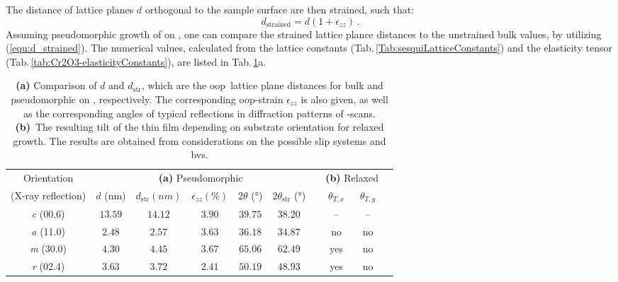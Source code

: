 The distance of lattice planes $d$ orthogonal to the sample surface are then strained, such that:
\begin{equation}
    \label{equ:d_strained}
    d_\mathrm{strained}=d(1+\epsilon_{zz})\,.
\end{equation}
Assuming pseudomorphic growth of  on , one can compare the strained lattice plance distances to the unstrained bulk values, by utilizing (\ref{equ:d_strained}).
The numerical values, calculated from the lattice constants (Tab.\,\ref{Tab:sesquiLatticeConstants}) and the elasticity tensor (Tab.\,\ref{tab:Cr2O3-elasticityConstants}), are listed in Tab.\,\ref{tab:d_strained}a.
\begin{table}
    \centering
    \caption{
        \textbf{(a)} Comparison of $d$ and $d_\mathrm{str}$, which are the \gls{oop}\ lattice plane distances for bulk  and pseudomorphic  on , respectively.
        The corresponding \gls{oop}-strain $\epsilon_{zz}$ is also given, as well as the corresponding angles of typical reflections in diffraction patterns of \thetaomega-scans.
        \textbf{(b)}~The resulting tilt of the thin film depending on substrate orientation for relaxed growth. The results are obtained from considerations on the possible slip systems and \glspl{bv}.}
    \begin{tabular}{cccccccccc}
        \toprule
        Orientation
            & \multicolumn{5}{c}{\textbf{(a)} Pseudomorphic}
            &&  \multicolumn{2}{c}{\textbf{(b)} Relaxed}
        \\
        \cmidrule(lr){2-6}
        \cmidrule(lr){8-9}
        (X-ray reflection)
            & $d$ (\si{nm}) & $d_\mathrm{str} (\si{nm})$ & $\epsilon_{zz} (\si{\percent})$
            &$2\theta$ (\si{\degree})&$2\theta_\mathrm{str}$ (\si{\degree})&& $\theta_{T,x}$   & $\theta_{T,y}$
        \\ \midrule
        \textit{c} (00.6)& $13.59$  & $14.12$   & $3.90$    & $39.75$   & $38.20$   &&--&--\\
        \textit{a} (11.0)& $2.48 $  & $2.57 $   & $3.63$    & $36.18$   & $34.87$   &&no&no\\
        \textit{m} (30.0)& $4.30 $  & $4.45 $   & $3.67$    & $65.06$   & $62.49$   &&yes&no\\
        \textit{r} (02.4)& $3.63 $  & $3.72 $   & $2.41$    & $50.19$   & $48.93$   &&yes&no\\
        \bottomrule
    \end{tabular}
    \label{tab:d_strained}
\end{table}

